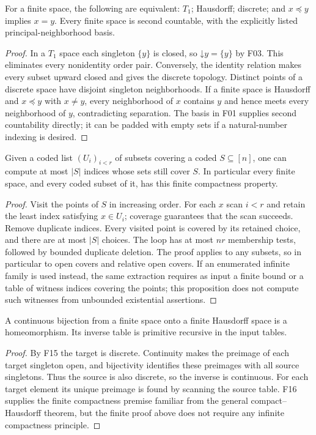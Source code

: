 \begin{theorem}\label{thm:finite-tone}
For a finite space, the following are equivalent: $T_1$;
Hausdorff; discrete; and $x\preceq y$ implies $x=y$.
Every finite space is second countable, with the explicitly listed
principal-neighborhood basis.
\end{theorem}
\begin{proof}
In a $T_1$ space each singleton $\{y\}$ is closed, so
$\mathord\downarrow y=\{y\}$ by F03.  This eliminates every
nonidentity order pair.  Conversely, the identity relation makes
every subset upward closed and gives the discrete topology.
Distinct points of a discrete space have disjoint singleton
neighborhoods.  If a finite space is Hausdorff and $x\preceq y$
with $x\ne y$, every neighborhood of $x$ contains $y$ and hence
meets every neighborhood of $y$, contradicting separation.
The basis in F01 supplies second countability directly; it can be
padded with empty sets if a natural-number indexing is desired.
\end{proof}

\begin{theorem}\label{thm:finite-cover}
Given a coded list $(U_i)_{i<r}$ of subsets covering a coded
$S\subseteq[n]$, one can compute at most $|S|$ indices whose sets
still cover $S$.  In particular every finite space, and every
coded subset of it, has this finite compactness property.
\end{theorem}
\begin{proof}
Visit the points of $S$ in increasing order.  For each $x$ scan
$i<r$ and retain the least index satisfying $x\in U_i$; coverage
guarantees that the scan succeeds.  Remove duplicate indices.
Every visited point is covered by its retained choice, and there
are at most $|S|$ choices.  The loop has at most $nr$ membership
tests, followed by bounded duplicate deletion.  The proof applies
to any subsets, so in particular to open covers and relative open
covers.  If an enumerated infinite family is used instead, the
same extraction requires as input a finite bound or a table of
witness indices covering the points; this proposition does not
compute such witnesses from unbounded existential assertions.
\end{proof}

\begin{theorem}\label{thm:finite-ch}
A continuous bijection from a finite space onto a finite Hausdorff
space is a homeomorphism.  Its inverse table is primitive recursive
in the input tables.
\end{theorem}
\begin{proof}
By F15 the target is discrete.  Continuity makes the preimage of
each target singleton open, and bijectivity identifies these
preimages with all source singletons.  Thus the source is also
discrete, so the inverse is continuous.  For each target element
its unique preimage is found by scanning the source table.
F16 supplies the finite compactness premise familiar from the
general compact--Hausdorff theorem, but the finite proof above
does not require any infinite compactness principle.
\end{proof}

